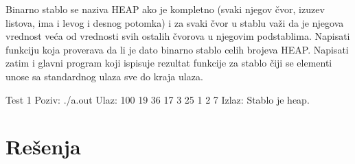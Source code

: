 \begin{Answer}[ref=714]
\end{Answer}


\begin{Exercise}[label=715]
Binarno stablo se naziva HEAP ako je kompletno (svaki njegov čvor, izuzev listova, ima i levog i desnog potomka) i za svaki čvor u stablu važi da je njegova vrednost veća od vrednosti svih ostalih čvorova u njegovim podstablima. Napisati funkciju  koja proverava da li je dato binarno stablo celih brojeva HEAP. Napisati zatim i glavni program koji ispisuje rezultat  funkcije za stablo čiji se elementi unose sa standardnog ulaza sve do kraja ulaza.

\begin{miditest}
\begin{test}{Test 1}
Poziv: ./a.out
Ulaz: 
	100 19 36 17 3 25 1 2 7
Izlaz: 
	Stablo je heap.
\end{test}
\end{miditest}

\end{Exercise}

\begin{Answer}[ref=715]
\end{Answer}


\section{Rešenja}
\shipoutAnswer
